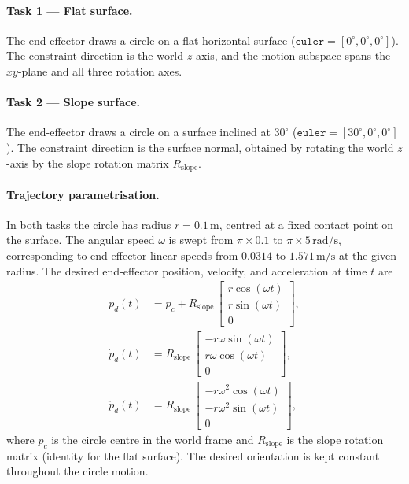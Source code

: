 \documentclass[
	german,%
	accentcolor=9c,%
	ruledheaders=section,%
	class=report,%
	thesis={type=bachelor},%
	fontsize=11pt,%
	parskip=half-,%
	custommargins=true,%
	marginpar=false,%
]{tudapub}
\begin{document}
\paragraph{Task 1 — Flat surface.}
The end-effector draws a circle on a flat horizontal surface
(\(\texttt{euler} = [0^\circ, 0^\circ, 0^\circ]\)).
The constraint direction is the world \(z\)-axis, and the motion subspace
spans the \(xy\)-plane and all three rotation axes.

\paragraph{Task 2 — Slope surface.}
The end-effector draws a circle on a surface inclined at \(30^\circ\)
(\(\texttt{euler} = [30^\circ, 0^\circ, 0^\circ]\)).
The constraint direction is the surface normal, obtained by rotating the
world \(z\)-axis by the slope rotation matrix \(R_\text{slope}\).

\paragraph{Trajectory parametrisation.}
In both tasks the circle has radius \(r = 0.1\,\mathrm{m}\), centred at a
fixed contact point on the surface.
The angular speed \(\omega\) is swept from \(\pi \times 0.1\) to
\(\pi \times 5\,\mathrm{rad/s}\), corresponding to end-effector linear speeds
from \(0.0314\) to \(1.571\,\mathrm{m/s}\) at the given radius.
The desired end-effector position, velocity, and acceleration at time \(t\) are
\begin{align}
    p_d(t) &= p_c + R_\text{slope}\,
              \begin{bmatrix}
                  r\cos(\omega t) \\ r\sin(\omega t) \\ 0
              \end{bmatrix}, \\
    \dot{p}_d(t) &= R_\text{slope}\,
              \begin{bmatrix}
                  -r\omega\sin(\omega t) \\ r\omega\cos(\omega t) \\ 0
              \end{bmatrix}, \\
    \ddot{p}_d(t) &= R_\text{slope}\,
              \begin{bmatrix}
                  -r\omega^2\cos(\omega t) \\ -r\omega^2\sin(\omega t) \\ 0
              \end{bmatrix},
\end{align}
where \(p_c\) is the circle centre in the world frame and \(R_\text{slope}\)
is the slope rotation matrix (identity for the flat surface).
The desired orientation is kept constant throughout the circle motion.
\end{document}
